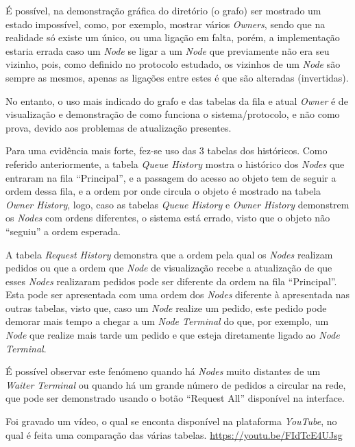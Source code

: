 É possível, na demonstração gráfica do diretório (o grafo) ser mostrado um estado impossível, como, por exemplo, mostrar vários \emph{Owners}, sendo que na realidade só existe um único, ou uma ligação em falta, porém, a implementação estaria errada caso um \emph{Node} se ligar a um \emph{Node} que previamente não era seu vizinho, pois, como definido no protocolo estudado, os vizinhos de um \emph{Node} são sempre as mesmos, apenas as ligações entre estes é que são alteradas (invertidas).

No entanto, o uso mais indicado do grafo e das tabelas da fila e atual \emph{Owner} é de visualização e demonstração de como funciona o sistema/protocolo, e não como prova, devido aos problemas de atualização presentes. 

Para uma evidência mais forte, fez-se uso das 3 tabelas dos históricos. 
Como referido anteriormente, a tabela \emph{Queue History} mostra o histórico dos \emph{Nodes} que entraram na fila ``Principal'', e a passagem do acesso ao objeto tem de seguir a ordem dessa fila, e a ordem por onde circula o objeto é mostrado na tabela \emph{Owner History}, logo, caso as tabelas \emph{Queue History} e \emph{Owner History} demonstrem os \emph{Nodes} com ordens diferentes, o sistema está errado, visto que o objeto não ``seguiu'' a ordem esperada.

A tabela \emph{Request History} demonstra que a ordem pela qual os \emph{Nodes} realizam pedidos ou que a ordem
que \emph{Node} de visualização recebe a atualização de que esses \emph{Nodes} realizaram pedidos pode ser diferente da ordem na fila ``Principal''.
Esta pode ser apresentada com uma ordem dos \emph{Nodes} diferente à apresentada nas outras tabelas, visto que, caso um \emph{Node} realize um pedido, este pedido pode demorar mais tempo a chegar a um \emph{Node Terminal} do que, por exemplo, um \emph{Node} que realize mais tarde um pedido e que esteja diretamente ligado ao \emph{Node Terminal}.

É possível observar este fenómeno quando há \emph{Nodes} muito distantes de um \emph{Waiter Terminal} ou quando há um grande número de pedidos a circular na rede,
que pode ser demonstrado usando o botão ``Request All'' disponível na interface.

Foi gravado um vídeo, o qual se enconta disponível na plataforma \emph{YouTube}, no qual é feita uma comparação das várias tabelas. \url{https://youtu.be/FIdTcE4UJsg}


